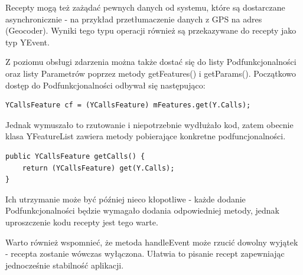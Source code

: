 \documentclass[11pt,a4paper,polish,thesis]{dcsbook}
\begin{document}
Recepty mogą też zażądać pewnych danych od systemu, które są dostarczane asynchronicznie - na przykład przetłumaczenie danych z GPS na adres (Geocoder). Wyniki tego typu operacji również są przekazywane do recepty jako typ YEvent.

Z poziomu obsługi zdarzenia można także dostać się do listy Podfunkcjonalności oraz listy Parametrów poprzez metody getFeatures() i getParams(). Początkowo dostęp do Podfunkcjonalności odbywał się następująco:
\begin{verbatim}
YCallsFeature cf = (YCallsFeature) mFeatures.get(Y.Calls);
\end{verbatim}
Jednak wymuszało to rzutowanie i niepotrzebnie wydłużało kod, zatem obecnie klasa YFeatureList zawiera metody pobierające konkretne podfuncjonalności.
\begin{verbatim}
public YCallsFeature getCalls() {
    return (YCallsFeature) get(Y.Calls);
}
\end{verbatim}
Ich utrzymanie może być później nieco kłopotliwe - każde dodanie Podfunkcjonalności będzie wymagało dodania odpowiedniej metody, jednak uproszczenie kodu recepty jest tego warte.

Warto również wspomnieć, że metoda handleEvent może rzucić dowolny wyjątek - recepta zostanie wówczas wyłączona. Ułatwia to pisanie recept zapewniając jednocześnie stabilność aplikacji.
\end{document}
